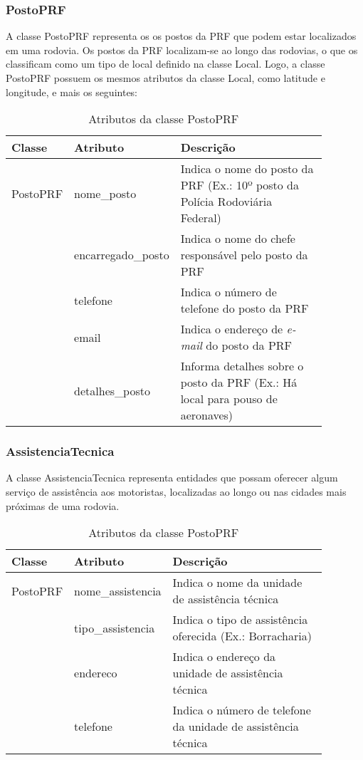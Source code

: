 \subsubsection{\textbf{PostoPRF}}

  A classe PostoPRF representa os os postos da PRF que podem estar localizados em uma rodovia.
  Os postos da PRF localizam-se ao longo das rodovias, o que os classificam como um tipo de local definido na
  classe Local. Logo, a classe PostoPRF possuem os mesmos atributos da classe Local, como latitude e longitude,
  e mais os seguintes:
  
    \begin{table*}[!h]
    \centering
    \begin{tabular}{p{0.15\linewidth}p{0.23\linewidth}p{0.5\linewidth}}
      \hline
      \textbf{Classe} & \textbf{Atributo} & \textbf{Descrição}\\
      \hline
	PostoPRF & nome\_posto & Indica o nome do posto da PRF (Ex.: 10º posto da Polícia Rodoviária Federal)\\
		 & encarregado\_posto & Indica o nome do chefe responsável pelo posto da PRF\\
		 & telefone & Indica o número de telefone do posto da PRF\\
		 & email & Indica o endereço de \textit{e-mail} do posto da PRF\\
		 & detalhes\_posto & Informa detalhes sobre o posto da PRF (Ex.: Há local para pouso de aeronaves)\\
      \hline
    \end{tabular}
    \caption{Atributos da classe PostoPRF}
    \label{tab:attr_postoprf}
    \end{table*}
    
\subsubsection{\textbf{AssistenciaTecnica}}

  A classe AssistenciaTecnica representa entidades que possam oferecer algum serviço de assistência aos motoristas, localizadas 
  ao longo ou nas cidades mais próximas de uma rodovia.
  
    \begin{table*}[!h]
    \centering
    \begin{tabular}{p{0.15\linewidth}p{0.23\linewidth}p{0.5\linewidth}}
      \hline
      \textbf{Classe} & \textbf{Atributo} & \textbf{Descrição}\\
      \hline
	PostoPRF & nome\_assistencia & Indica o nome da unidade de assistência técnica\\
		 & tipo\_assistencia & Indica o tipo de assistência oferecida (Ex.: Borracharia)\\
		 & endereco & Indica o endereço da unidade de assistência técnica\\
		 & telefone & Indica o número de telefone da unidade de assistência técnica\\
      \hline
    \end{tabular}
    \caption{Atributos da classe PostoPRF}
    \label{tab:attr_postoprf}
    \end{table*}
    
